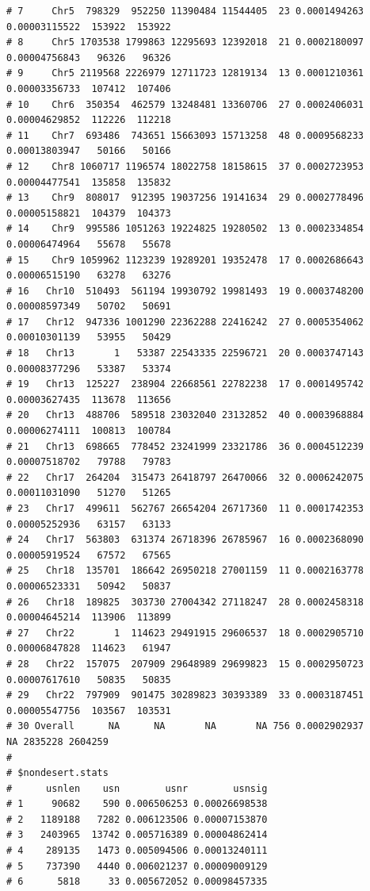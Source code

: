 \documentclass{article}\usepackage[]{graphicx}\usepackage[]{color}
\makeatletter
\newenvironment{kframe}{%
 \def\at@end@of@kframe{}%
 \ifinner\ifhmode%
  \def\at@end@of@kframe{\end{minipage}}%
  \begin{minipage}{\columnwidth}%
 \fi\fi%
 \def\FrameCommand##1{\hskip\@totalleftmargin \hskip-\fboxsep
 \colorbox{shadecolor}{##1}\hskip-\fboxsep
     \hskip-\linewidth \hskip-\@totalleftmargin \hskip\columnwidth}%
 \MakeFramed {\advance\hsize-\width
   \@totalleftmargin\z@ \linewidth\hsize
   \@setminipage}}%
 {\par\unskip\endMakeFramed%
 \at@end@of@kframe}
\newenvironment{knitrout}{}{} %
\makeatother
\begin{document}
\begin{knitrout}
\begin{kframe}
\begin{verbatim}
# 7     Chr5  798329  952250 11390484 11544405  23 0.0001494263 0.00003115522  153922  153922
# 8     Chr5 1703538 1799863 12295693 12392018  21 0.0002180097 0.00004756843   96326   96326
# 9     Chr5 2119568 2226979 12711723 12819134  13 0.0001210361 0.00003356733  107412  107406
# 10    Chr6  350354  462579 13248481 13360706  27 0.0002406031 0.00004629852  112226  112218
# 11    Chr7  693486  743651 15663093 15713258  48 0.0009568233 0.00013803947   50166   50166
# 12    Chr8 1060717 1196574 18022758 18158615  37 0.0002723953 0.00004477541  135858  135832
# 13    Chr9  808017  912395 19037256 19141634  29 0.0002778496 0.00005158821  104379  104373
# 14    Chr9  995586 1051263 19224825 19280502  13 0.0002334854 0.00006474964   55678   55678
# 15    Chr9 1059962 1123239 19289201 19352478  17 0.0002686643 0.00006515190   63278   63276
# 16   Chr10  510493  561194 19930792 19981493  19 0.0003748200 0.00008597349   50702   50691
# 17   Chr12  947336 1001290 22362288 22416242  27 0.0005354062 0.00010301139   53955   50429
# 18   Chr13       1   53387 22543335 22596721  20 0.0003747143 0.00008377296   53387   53374
# 19   Chr13  125227  238904 22668561 22782238  17 0.0001495742 0.00003627435  113678  113656
# 20   Chr13  488706  589518 23032040 23132852  40 0.0003968884 0.00006274111  100813  100784
# 21   Chr13  698665  778452 23241999 23321786  36 0.0004512239 0.00007518702   79788   79783
# 22   Chr17  264204  315473 26418797 26470066  32 0.0006242075 0.00011031090   51270   51265
# 23   Chr17  499611  562767 26654204 26717360  11 0.0001742353 0.00005252936   63157   63133
# 24   Chr17  563803  631374 26718396 26785967  16 0.0002368090 0.00005919524   67572   67565
# 25   Chr18  135701  186642 26950218 27001159  11 0.0002163778 0.00006523331   50942   50837
# 26   Chr18  189825  303730 27004342 27118247  28 0.0002458318 0.00004645214  113906  113899
# 27   Chr22       1  114623 29491915 29606537  18 0.0002905710 0.00006847828  114623   61947
# 28   Chr22  157075  207909 29648989 29699823  15 0.0002950723 0.00007617610   50835   50835
# 29   Chr22  797909  901475 30289823 30393389  33 0.0003187451 0.00005547756  103567  103531
# 30 Overall      NA      NA       NA       NA 756 0.0002902937            NA 2835228 2604259
# 
# $nondesert.stats
#      usnlen    usn        usnr        usnsig
# 1     90682    590 0.006506253 0.00026698538
# 2   1189188   7282 0.006123506 0.00007153870
# 3   2403965  13742 0.005716389 0.00004862414
# 4    289135   1473 0.005094506 0.00013240111
# 5    737390   4440 0.006021237 0.00009009129
# 6      5818     33 0.005672052 0.00098457335

\end{verbatim}
\end{kframe}
\end{knitrout}
\end{document}

